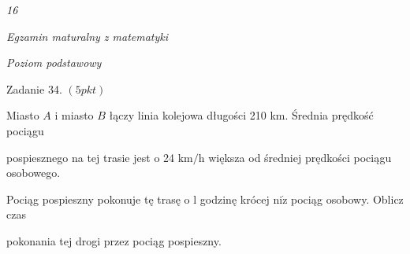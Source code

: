 \documentclass[a4paper,12pt]{article}
\begin{document}
{\it 16}

{\it Egzamin maturalny z matematyki}

{\it Poziom podstawowy}

Zadanie 34. $(5pkt)$

Miasto $A$ i miasto $B$ łączy linia kolejowa długości 210 km. Średnia prędkość pociągu

pospiesznego na tej trasie jest o 24 $\mathrm{k}\mathrm{m}/\mathrm{h}$ większa od średniej prędkości pociągu osobowego.

Pociąg pospieszny pokonuje tę trasę o l godzinę krócej $\mathrm{n}\mathrm{i}\dot{\mathrm{z}}$ pociąg osobowy. Oblicz czas

pokonania tej drogi przez pociąg pospieszny.
\end{document}
